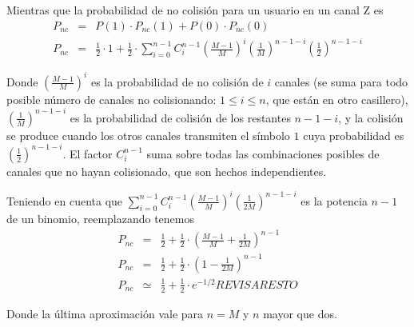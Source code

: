 \noindent Mientras que la probabilidad de no colisión para un usuario en un canal Z es
\begin{eqnarray}
P_{nc} & = & P(1) \cdot P_{nc}(1) + P(0) \cdot P_{nc}(0) \\
P_{nc} & = & \frac{1}{2} \cdot 1 +  \frac{1}{2} \cdot \sum_{i=0}^{n-1} 
C^{n-1}_{i} \left(\frac{M-1}{M}\right)^i  \left(\frac{1}{M}\right)^{n-1-i}  \left(\frac{1}{2}\right)^{n-1-i} 
\end{eqnarray}

\noindent Donde $\left(\frac{M-1}{M}\right)^i$ es la probabilidad de no colisión de $i$ canales (se suma para todo posible número de canales no
colisionando: $1\leq i\leq n$, que están en otro casillero), $
\left(\frac{1}{M}\right)^{n-1-i}$ es la probabilidad de colisión de los restantes
$n-1-i$, y la colisión se produce cuando los otros canales
transmiten el símbolo $1$ cuya probabilidad es $\left(\frac{1}{2}\right)^{n-1-i}$. El
factor $C^{n-1}_{i}$ suma sobre todas las combinaciones posibles de canales que no
hayan colisionado, que son hechos independientes.

\noindent Teniendo en cuenta que $ \sum_{i=0}^{n-1}
C^{n-1}_{i} \left(\frac{M-1}{M}\right)^i  \left(\frac{1}{2M}\right)^{n-1-i}$ es la potencia $n-1$ de un binomio, reemplazando tenemos
\begin{eqnarray}
P_{nc} & = & \frac{1}{2} +  \frac{1}{2} \cdot \left(\frac{M-1}{M} + \frac{1}{2M} \right)^{n-1} \\
P_{nc} & = & \frac{1}{2} +  \frac{1}{2} \cdot \left(1- \frac{1}{2M} \right)^{n-1} \\
P_{nc} & \simeq & \frac{1}{2} +  \frac{1}{2} \cdot e^{-1/2} REVISAR ESTO
\end{eqnarray}

\noindent Donde la última aproximación vale para $n=M$ y $n$ mayor que dos.

\iffalse

\vspace{5mm}

